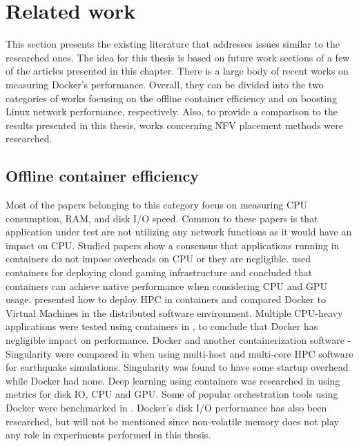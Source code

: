 \documentclass[english]{kththesis}
\begin{document}
\section{Related work}
This section presents the existing literature that addresses issues similar to the researched ones. The idea for this thesis is based on future work sections of a few of the articles presented in this chapter.
There is a large body of recent works on measuring Docker’s performance. Overall, they can be divided into the two categories of works focusing on the offline container efficiency and on boosting Linux network performance, respectively. Also, to provide a comparison to the results presented in this thesis, works concerning NFV placement methods were researched.

\subsection{Offline container efficiency}
Most of the papers belonging to this category focus on measuring CPU consumption, RAM, and disk I/O speed. Common to these papers is that application under test are not utilizing any network functions as it would have an impact on CPU. Studied papers show a consensus that applications running in containers do not impose overheads on CPU or they are negligible. \cite{cloud_gaming_2015} used containers for deploying cloud gaming infrastructure and concluded that containers can achieve native performance when considering CPU and GPU usage. \cite{docker_hpc_2016} presented how to deploy \gls{HPC} in containers and compared Docker to Virtual Machines in the distributed software environment. Multiple CPU-heavy applications were tested using containers in \cite{genomic_pipes_2015}, to conclude that Docker has negligible impact on performance. Docker and another containerization software - Singularity were compared in \cite{docker_hpc_2018} when using multi-host and multi-core \gls{HPC} software for earthquake simulations. Singularity was found to have some startup overhead while Docker had none. Deep learning using containers was researched in \cite{deep_learning_2017} using metrics for disk IO, CPU and GPU. Some of popular orchestration tools using Docker were benchmarked in \cite{cloud_orchestration_2019}. Docker’s disk I/O performance has also been researched, but will not be mentioned since non-volatile memory does not play any role in experiments performed in this thesis.
\end{document}
